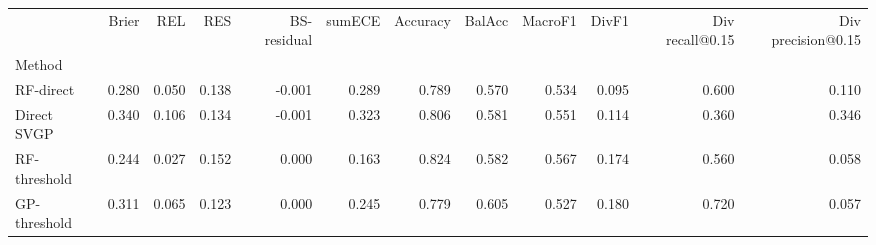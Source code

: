 \begin{tabular}{lrrrrrrrrrrr}
\toprule
 & Brier & REL & RES & BS-residual & sumECE & Accuracy & BalAcc & MacroF1 & DivF1 & Div recall@0.15 & Div precision@0.15 \\
Method &  &  &  &  &  &  &  &  &  &  &  \\
\midrule
RF-direct & 0.280 & 0.050 & 0.138 & -0.001 & 0.289 & 0.789 & 0.570 & 0.534 & 0.095 & 0.600 & 0.110 \\
Direct SVGP & 0.340 & 0.106 & 0.134 & -0.001 & 0.323 & 0.806 & 0.581 & 0.551 & 0.114 & 0.360 & 0.346 \\
RF-threshold & 0.244 & 0.027 & 0.152 & 0.000 & 0.163 & 0.824 & 0.582 & 0.567 & 0.174 & 0.560 & 0.058 \\
GP-threshold & 0.311 & 0.065 & 0.123 & 0.000 & 0.245 & 0.779 & 0.605 & 0.527 & 0.180 & 0.720 & 0.057 \\
\bottomrule
\end{tabular}
